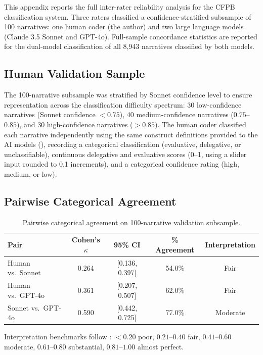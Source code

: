 This appendix reports the full inter-rater reliability analysis for the CFPB classification system. Three raters classified a confidence-stratified subsample of 100 narratives: one human coder (the author) and two large language models (Claude 3.5 Sonnet and GPT-4o). Full-sample concordance statistics are reported for the dual-model classification of all 8,943 narratives classified by both models.

\subsection{Human Validation Sample}

The 100-narrative subsample was stratified by Sonnet confidence level to ensure representation across the classification difficulty spectrum: 30 low-confidence narratives (Sonnet confidence $< 0.75$), 40 medium-confidence narratives ($0.75$--$0.85$), and 30 high-confidence narratives ($> 0.85$). The human coder classified each narrative independently using the same construct definitions provided to the AI models (), recording a categorical classification (evaluative, delegative, or unclassifiable), continuous delegative and evaluative scores (0--1, using a slider input rounded to 0.1 increments), and a categorical confidence rating (high, medium, or low).

\subsection{Pairwise Categorical Agreement}

\begin{table}[H]
\centering
\caption{Pairwise categorical agreement on 100-narrative validation subsample.}
\label{tab:pairwise_kappa}
\begin{tabular}{lcccc}
\toprule
Pair & Cohen's $\kappa$ & 95\% CI & \% Agreement & Interpretation \\
\midrule
Human vs.\ Sonnet  & 0.264 & [0.136, 0.397] & 54.0\% & Fair \\
Human vs.\ GPT-4o  & 0.361 & [0.207, 0.507] & 62.0\% & Fair \\
Sonnet vs.\ GPT-4o & 0.590 & [0.442, 0.725] & 77.0\% & Moderate \\
\bottomrule
\end{tabular}
\begin{tablenotes}
\small
\item Interpretation benchmarks follow \citet{landis1977}: $< 0.20$ poor, $0.21$--$0.40$ fair, $0.41$--$0.60$ moderate, $0.61$--$0.80$ substantial, $0.81$--$1.00$ almost perfect.
\end{tablenotes}
\end{table}

